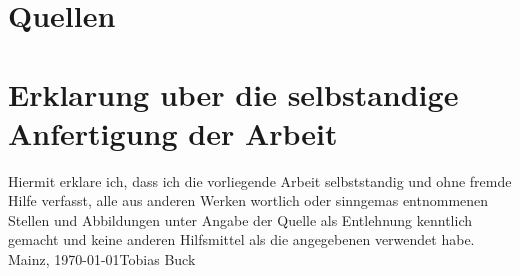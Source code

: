 \documentclass[a4paper,12pt,arial]{scrartcl}
\newcommand{\Name}{Tobias Buck}
\newcommand{\Ort}{Mainz}
\begin{document}
\section{Quellen}


\printbibheading
\printbibliography[type=online,heading=subbibliography,title={Digital}]
\printbibliography[nottype=online,heading=subbibliography,title={Bucher}]



\section{Erklarung uber die selbstandige Anfertigung der Arbeit}
Hiermit erklare ich, dass ich die vorliegende Arbeit selbststandig und ohne fremde Hilfe verfasst, alle aus anderen Werken wortlich oder sinngemas entnommenen Stellen und Abbildungen unter Angabe der Quelle als Entlehnung kenntlich gemacht und keine anderen Hilfsmittel als die angegebenen verwendet habe. \\
\Ort, \today \space \Name
\end{document}
